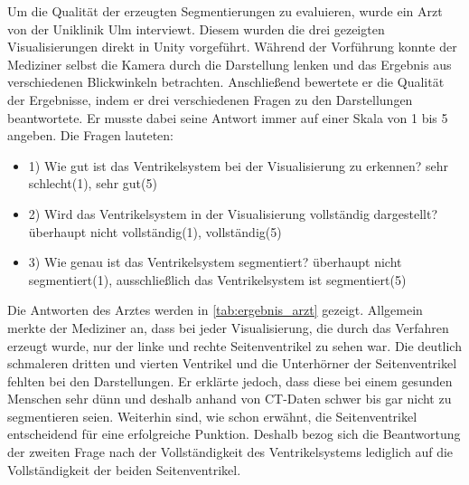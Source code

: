 Um die Qualität der erzeugten Segmentierungen zu evaluieren, wurde ein Arzt von der Uniklinik Ulm interviewt. Diesem wurden die drei gezeigten Visualisierungen direkt in Unity vorgeführt. Während der Vorführung konnte der Mediziner selbst die Kamera durch die Darstellung lenken und das Ergebnis aus verschiedenen Blickwinkeln betrachten.
\newline
Anschließend bewertete er die Qualität der Ergebnisse, indem er drei verschiedenen Fragen zu den Darstellungen beantwortete. Er musste dabei seine Antwort immer auf einer Skala von 1 bis 5 angeben.
Die Fragen lauteten:
\begin{itemize}
	\item 1) Wie gut ist das Ventrikelsystem bei der Visualisierung zu erkennen? \newline sehr schlecht(1), sehr gut(5)
	\item 2) Wird das Ventrikelsystem in der Visualisierung vollständig dargestellt? \newline überhaupt nicht vollständig(1), vollständig(5)
	\item 3) Wie genau ist das Ventrikelsystem segmentiert? \newline überhaupt nicht segmentiert(1), ausschließlich das Ventrikelsystem ist segmentiert(5)
\end{itemize}


Die Antworten des Arztes werden in \autoref{tab:ergebnis_arzt} gezeigt. Allgemein merkte der Mediziner an, dass bei jeder Visualisierung, die durch das Verfahren erzeugt wurde, nur der linke und rechte Seitenventrikel zu sehen war. Die deutlich schmaleren dritten und vierten Ventrikel und die Unterhörner der Seitenventrikel fehlten bei den Darstellungen. Er erklärte jedoch, dass diese bei einem gesunden Menschen sehr dünn und deshalb anhand von CT-Daten schwer bis gar nicht zu segmentieren seien. Weiterhin sind, wie schon erwähnt, die Seitenventrikel entscheidend für eine erfolgreiche Punktion.
\newline
Deshalb bezog sich die Beantwortung der zweiten Frage nach der Vollständigkeit des Ventrikelsystems lediglich auf die Vollständigkeit der beiden Seitenventrikel.

\begin{table}[h]
\centering
\tiny
{}
\caption{Ergebnisse des Interviews mit einem Arzt}
\label{tab:ergebnis_arzt}
\end{table}


